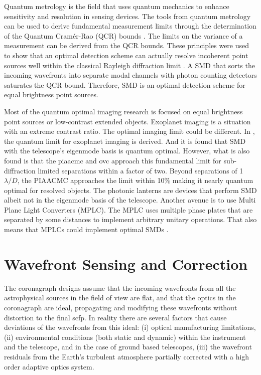 \documentclass[letterpaper]{ar-1col}
\newcommand{\ld}{$\lambda/D$}
\begin{document}
Quantum metrology is the field that uses quantum mechanics to enhance sensitivity and resolution in sensing devices.
%
The tools from quantum metrology can be used to derive fundamental measurement limits through the determination of the Quantum Cram\'er-Rao (QCR) bounds \citep{braunstein1994statistical}.
%
The limits on the variance of a measurement can be derived from the QCR bounds.
%
These principles were used to show that an optimal detection scheme can actually resolve incoherent point sources well within the classical Rayleigh diffraction limit \citep{tsang2016quantum}.
%
A SMD that sorts the incoming wavefronts into separate modal channels with photon counting detectors saturates the QCR bound.
%
Therefore, SMD is an optimal detection scheme for equal brightness point sources.

Most of the quantum optimal imaging research is focused on equal brightness point sources or low-contrast extended objects.
%
Exoplanet imaging is a situation with an extreme contrast ratio.
%
The optimal imaging limit could be different.
%
In \citet{deshler2024achieving}, the quantum limit for exoplanet imaging is derived.
%
And it is found that SMD with the telescope's eigenmode basis is quantum optimal. 
%
However, what is also found is that the \ac{piaacmc} and \ac{ovc} approach this fundamental limit for sub-diffraction limited separations within a factor of two.
%
Beyond separations of 1 \ld{}, the PIAACMC approaches the limit within 10\% making it nearly quantum optimal for resolved objects.
%
The photonic lanterns are devices that perform SMD albeit not in the eigenmode basis of the telescope.
%
Another avenue is to use Multi Plane Light Converters (MPLC).
%
The MPLC uses multiple phase plates that are separated by some distances to implement arbitrary unitary operations.
%
That also means that MPLCs could implement optimal SMDs \citep{deshler2024experimental}.

\section{Wavefront Sensing and Correction}

The coronagraph designs assume that the incoming wavefronts from all the astrophysical sources in the field of view are flat, and that the optics in the coronagraph are ideal, propagating and modifying these wavefronts without distortion to the final \ac{scfp}.
%
In reality there are several factors that cause deviations of the wavefronts from this ideal: (i) optical manufacturing limitations, (ii) environmental conditions (both static and dynamic) within the instrument and the telescope, and in the case of ground based telescopes, (iii) the wavefront residuals from the Earth's turbulent atmosphere partially corrected with a high order adaptive optics system.
\end{document}
